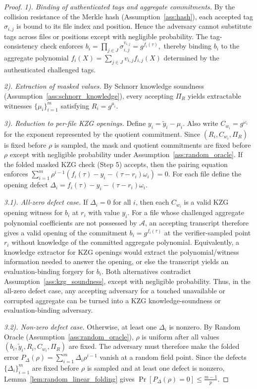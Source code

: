 \documentclass[lettersize,journal]{IEEEtran}
\begin{document}
\begin{proof}


\textit{1). Binding of authenticated tags and aggregate commitments.}
By the collision resistance of the Merkle hash (Assumption~\ref{ass:hash}), each accepted tag $\sigma_{i,j}$ is bound to its file index and position. Hence the adversary cannot substitute tags across files or positions except with negligible probability. The tag-consistency check enforces
$b_i = \prod_{j\in J} \sigma_{i,j}^{v_{i,j}} = g^{f_i(\tau)},$
thereby binding $b_i$ to the aggregate polynomial $f_i(X)=\sum_{j\in J}v_{i,j}f_{i,j}(X)$
determined by the authenticated challenged tags.


\textit{2). Extraction of masked values.} By Schnorr knowledge soundness (Assumption~\ref{ass:schnorr_knowledge}), every accepting $\Pi_R$ yields extractable witnesses $\{\mu_i\}_{i=1}^m$ satisfying $R_i=g^{\mu_i}$. 

\textit{3). Reduction to per-file KZG openings.} Define \(y_i=\tilde{y}_i-\mu_i\). Also write $C_{w_i}=g^{\omega_i}$ for the exponent represented by the quotient commitment. Since $(R_i,C_{w_i},\Pi_R)$ is fixed before $\rho$ is sampled, the mask and quotient commitments are fixed before $\rho$ except with negligible probability under Assumption~\ref{ass:random_oracle}. 
If the folded masked KZG check (Step 5) accepts, then the pairing equation enforces $\sum_{i=1}^m \rho^{i-1}
\left(f_i(\tau)-y_i-(\tau-r_i)\omega_i\right)=0.$
For each file define the opening defect $\Delta_i=f_i(\tau)-y_i-(\tau-r_i)\omega_i.$

\textit{3.1). All-zero defect case.}
If $\Delta_i = 0$ for all $i$, then each $C_{w_i}$ is a valid KZG opening witness for $b_i$ at $r_i$ with value $y_i$. For a file whose challenged aggregate polynomial coefficients are not possessed by $\mathcal{A}$, an accepting transcript therefore gives a valid opening of the commitment \(b_i=g^{f_i(\tau)}\) at the verifier-sampled point \(r_i\) without knowledge of the committed aggregate polynomial. Equivalently, a knowledge extractor for KZG openings would extract the polynomial/witness information needed to answer the opening, or else the transcript yields an evaluation-binding forgery for \(b_i\). Both alternatives contradict Assumption~\ref{ass:kzg_soundness}, except with negligible probability. Thus, in the all-zero defect case, any accepting adversary for a touched unavailable or corrupted aggregate can be turned into a KZG knowledge-soundness or evaluation-binding adversary.

\textit{3.2). Non-zero defect case.} Otherwise, at least one $\Delta_i$ is nonzero. By Random Oracle (Assumption~\ref{ass:random_oracle}), $\rho$ is uniform after all values $(b_i,\tilde{y}_i,R_i,C_{w_i},\Pi_R)$ are fixed. The adversary must therefore make the folded error $P_\Delta(\rho)=\sum_{i=1}^m \Delta_i\rho^{i-1}$ vanish at a random field point. Since the defects \(\{\Delta_i\}_{i=1}^m\) are fixed before \(\rho\) is sampled and at least one defect is nonzero, Lemma~\ref{lem:random_linear_folding} gives
$
\Pr[P_\Delta(\rho)=0]\le \frac{m-1}{p}.
$


\end{proof}
\end{document}
